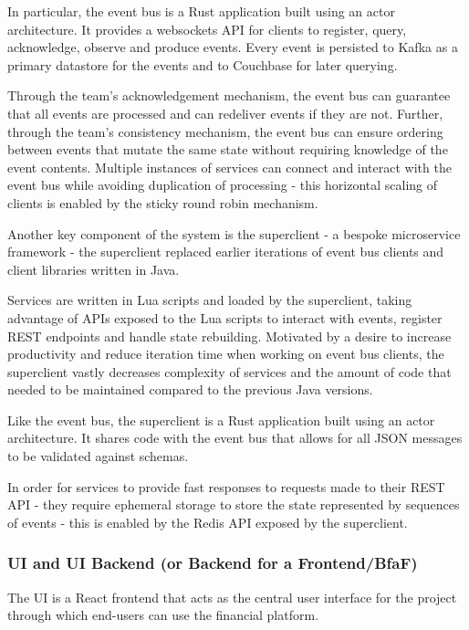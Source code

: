 \documentclass{l3proj}
\begin{document}
In particular, the event bus is a Rust \cite{rust} application built using an actor architecture. It provides a websockets API for clients to register, query, acknowledge, observe and produce events. Every event is persisted to Kafka \cite{kafka} as a primary datastore for the events and to Couchbase \cite{couchbase} for later querying.

Through the team's acknowledgement mechanism, the event bus can guarantee that all events are processed and can redeliver events if they are not. Further, through the team's consistency mechanism, the event bus can ensure ordering between events that mutate the same state without requiring knowledge of the event contents. Multiple instances of services can connect and interact with the event bus while avoiding duplication of processing - this horizontal scaling of clients is enabled by the sticky round robin mechanism.

Another key component of the system is the superclient - a bespoke microservice framework - the superclient replaced earlier iterations of event bus clients and client libraries written in Java.

Services are written in Lua \cite{lua} scripts and loaded by the superclient, taking advantage of APIs exposed to the Lua scripts to interact with events, register REST endpoints and handle state rebuilding. Motivated by a desire to increase productivity and reduce iteration time when working on event bus clients, the superclient vastly decreases complexity of services and the amount of code that needed to be maintained compared to the previous Java versions.

Like the event bus, the superclient is a Rust application built using an actor architecture. It shares code with the event bus that allows for all JSON messages to be validated against schemas.

In order for services to provide fast responses to requests made to their REST API - they require ephemeral storage to store the state represented by sequences of events - this is enabled by the Redis \cite{redis} API exposed by the superclient.

\subsubsection{UI and UI Backend (or Backend for a Frontend/BfaF)}
The UI is a React \cite{react} frontend that acts as the central user interface for the project through which end-users can use the financial platform.
\end{document}
